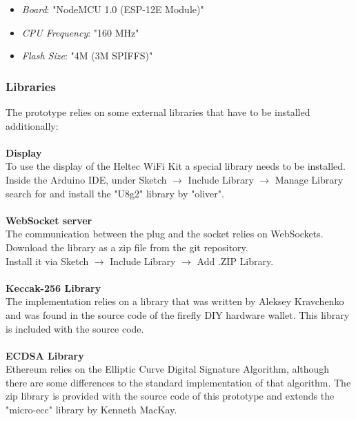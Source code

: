 \begin{itemize}
    \item \textit{Board}: "NodeMCU 1.0 (ESP-12E Module)"
    \item \textit{CPU Frequency}: "160 MHz"
    \item \textit{Flash Size}: "4M (3M SPIFFS)"
\end{itemize}
\leavevmode
\subsubsection{Libraries}
The prototype relies on some external libraries that have to be installed additionally:
\\\\
\textbf{Display}\\
To use the display of the Heltec WiFi Kit a special library needs to be installed.
Inside the Arduino IDE, under Sketch $\rightarrow$ Include Library $\rightarrow$ Manage Library search for and install the "U8g2" library by "oliver".
\\\\
\textbf{WebSocket server}\\
The communication between the plug and the socket relies on WebSockets.
Download the library as a zip file from the git repository\cite{websockets}.
\\
Install it via Sketch $\rightarrow$ Include Library $\rightarrow$ Add .ZIP Library.
\\\\
\textbf{Keccak-256 Library}\\
The implementation relies on a library that was written by Aleksey Kravchenko and was found in the source code of the firefly DIY hardware wallet\cite{keccak-source}.
This library is included with the source code.
\\\\
\textbf{ECDSA Library}\\
Ethereum relies on the Elliptic Curve Digital Signature Algorithm, although there are some differences to the standard implementation of that algorithm.
The zip library is provided with the source code of this prototype and extends the "micro-ecc" library by Kenneth MacKay\cite{micro-ecc}.
\\
